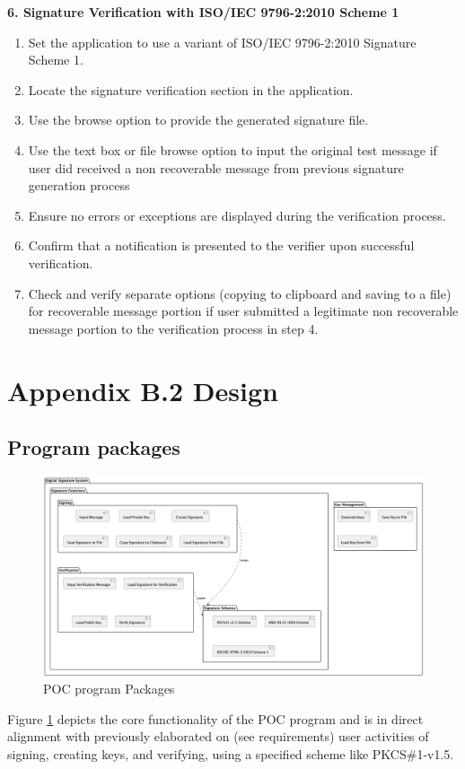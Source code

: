 \documentclass[]{final_report}
\theoremstyle{definition}
\begin{document}
\textbf{6. Signature Verification with ISO/IEC 9796-2:2010 Scheme 1}
\begin{enumerate}
\item Set the application to use a variant of ISO/IEC 9796-2:2010 Signature Scheme 1.
\item Locate the signature verification section in the application.
\item Use the browse option to provide the generated signature file.
\item Use the text box or file browse option to input the original test message if user did received a non recoverable message from previous signature generation process
\item Ensure no errors or exceptions are displayed during the verification process.
\item Confirm that a notification is presented to the verifier upon successful verification.
\item Check and verify separate options (copying to clipboard and saving to a file) for  recoverable message portion if user submitted a legitimate non recoverable message portion to the verification process in step 4.
\end{enumerate}

\section{Appendix B.2 Design}
\subsection{Program packages}
\begin{figure}[H]
    \centering
    \includegraphics[scale=0.31]{poc_pictures/package.png}
    \caption{POC program Packages}
    \label{fig:pack}
\end{figure}
Figure \ref{fig:pack} depicts the core functionality of the POC program and is in direct alignment with previously elaborated on (see requirements) user activities of signing, creating keys, and verifying, using a specified scheme like PKCS\#1-v1.5.
\end{document}
